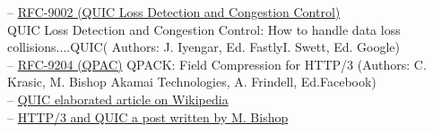 \documentclass[10pt,a4paper,english]{article}
\begin{document}
\begin{multicols}{2}
\begin{flushleft}
\hspace*{1em}-- \href{https://www.rfc-editor.org/rfc/rfc9002.pdf}{RFC-9002 (QUIC Loss Detection and Congestion Control)} \\QUIC Loss Detection and Congestion Control: How to handle data loss collisions....QUIC( Authors: J. Iyengar, Ed. FastlyI. Swett, Ed. Google) \\
\hspace*{1em}-- \href{https://www.rfc-editor.org/rfc/rfc9204.pdf}{RFC-9204 (QPAC)}  QPACK: Field Compression for HTTP/3 (Authors: C. Krasic, M. Bishop Akamai Technologies,
A. Frindell, Ed.Facebook) \\
\hspace*{1em}-- \href{https://en.wikipedia.org/wiki/QUIC}{QUIC elaborated article on Wikipedia}\\
\hspace*{1em}-- \href{https://www.akamai.com/blog/performance/http3-and-quic-past-present-and-future}{HTTP/3 and QUIC a post written by  M. Bishop}\\
\end{flushleft}
\end{multicols}
\end{document}
